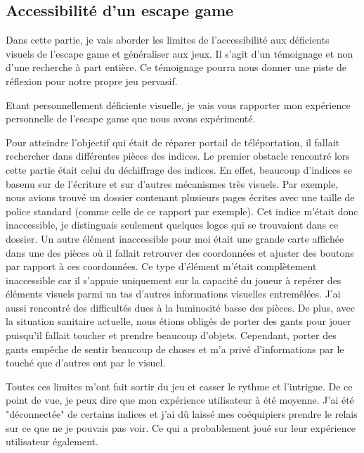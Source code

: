 \documentclass[11pt]{article}
\begin{document}
	\subsection{Accessibilité d'un escape game}
		Dans cette partie, je vais aborder les limites de l'accessibilité aux déficients visuels de l'escape game et généraliser aux jeux.
		Il s'agit d'un témoignage et non d'une recherche à part entière.
		Ce témoignage pourra nous donner une piste de réflexion pour notre propre jeu pervasif.\par
		Etant personnellement déficiente visuelle, je vais vous rapporter mon expérience personnelle de l'escape game que nous avons expérimenté.\par
		Pour atteindre l'objectif qui était de réparer portail de téléportation, il fallait rechercher dans différentes pièces des indices.
		Le premier obstacle rencontré lors cette partie était celui du déchiffrage des indices.
		En effet, beaucoup d'indices se basenu sur de l'écriture et sur d'autres mécanismes très visuels.
		Par exemple, nous avions trouvé un dossier contenant plusieurs pages écrites avec une taille de police standard (comme celle de ce rapport par exemple).
		Cet indice m'était donc inaccessible, je distinguais seulement quelques logos qui se trouvaient dans ce dossier.
		Un autre élément inaccessible pour moi était une grande carte affichée dans une des pièces où il fallait retrouver des coordonnées et ajuster des boutons par rapport à ces coordonnées.
		Ce type d'élément m'était complètement inaccessible car il s'appuie uniquement sur la capacité du joueur à repérer des éléments visuels parmi un tas d'autres informations visuelles entremêlées.
		J'ai aussi rencontré des difficultés dues à la luminosité basse des pièces.
		De plus, avec la situation sanitaire actuelle, nous étions obligés de porter des gants pour jouer puisqu'il fallait toucher et prendre beaucoup d'objets.
		Cependant, porter des gants empêche de sentir beaucoup de choses et m'a privé d'informations par le touché que d'autres ont par le visuel.\par
		Toutes ces limites m'ont fait sortir du jeu et casser le rythme et l'intrigue.
		De ce point de vue, je peux dire que mon expérience utilisateur à été moyenne.
		J'ai été "déconnectée" de certains indices et j'ai dû laissé mes coéquipiers prendre le relais sur ce que ne je pouvais pas voir.
		Ce qui a probablement joué sur leur expérience utilisateur également.
\end{document}
